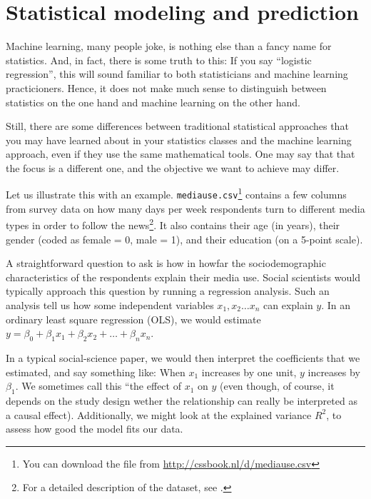 \section{Statistical modeling and prediction}
\label{sec:prediction}
Machine learning, many people joke, is nothing else than a fancy name
for statistics.  And, in fact, there is some truth to this: If you say
``logistic regression'', this will sound familiar to both
statisticians and machine learning practicioners.  Hence, it does not
make much sense to distinguish between statistics on the one hand and
machine learning on the other hand.

Still, there are some differences between traditional statistical
approaches that you may have learned about in your statistics classes
and the machine learning approach, even if they use the same
mathematical tools. One may say that that the focus is a different
one, and the objective we want to achieve may differ.

Let us illustrate this with an example.
\texttt{mediause.csv}\footnote{You can download the file from
  \url{http://cssbook.nl/d/mediause.csv}} contains a few columns from
survey data on how many days per week respondents turn to different
media types in order to follow the news\footnote{For a detailed
  description of the dataset, see \citet{Trilling2013phd}.}. It also
contains their age (in years), their gender (coded as female = 0, male
= 1), and their education (on a 5-point scale).

A straightforward question to ask is how in howfar the
sociodemographic characteristics of the respondents explain their
media use.  Social scientists would typically approach this question
by running a regression analysis.  Such an analysis tell us how some
independent variables $x_1, x_2 \ldots x_n$ can explain $y$.  In an
ordinary least square regression (OLS), we would estimate $y=\beta_0 +
\beta_1 x_1 + \beta_2 x_2 + \ldots + \beta_n x_n$.

In a typical social-science paper, we would then interpret the coefficients
that we estimated, and say something like: When $x_1$ increases by one unit,
$y$ increases by $\beta_1$.
We sometimes call this ``the effect of $x_1$ on $y$ (even though, of course,
it depends on the study design wether the relationship can really be interpreted
as a causal effect).
Additionally, we might look at the explained variance $R^2$, to assess how good
the model fits our data.


